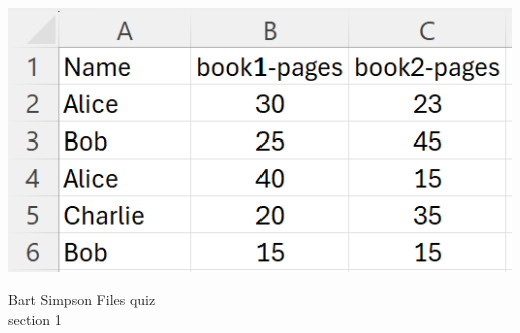 \documentclass{article}
\begin{document}
\begin{enumerate}
		\begin{flushright}
			\includegraphics[scale=.65]{imgs/PagesReadData.PNG}
		\end{flushright}


\end{enumerate}
\pagebreak
Bart Simpson \hfill Files quiz\\
section 1\\
\end{document}
